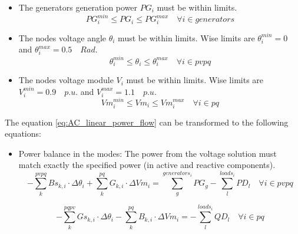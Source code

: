 \documentclass[nols,a4paper,twoside,notoc,fleqn]{tufte-book}
\begin{document}
\begin{itemize}
	\item The generators generation power $PG_i$ must be within limits.
	\begin{equation}
	PG_i^{min} \leq PG_i \leq PG_i^{max}  \quad \forall i \in generators
	\end{equation}
	
	\item The nodes voltage angle $\theta_i$ must be within limits. Wise limits are  $\theta_i^{min}=0$ and $\theta_i^{max}=0.5 \quad Rad$.
	\begin{equation}
	\theta_i^{min} \leq \theta_i \leq \theta_i^{max}  \quad \forall i \in pvpq
	\end{equation}
	
	\item The nodes voltage module $V_i$ must be within limits. Wise limits are  $V_i^{min}=0.9 \quad p.u.$ and $V_i^{max}=1.1 \quad p.u$.
	\begin{equation}
	Vm_i^{min} \leq Vm_i \leq Vm_i^{max}  \quad \forall i \in pq
	\end{equation}
\end{itemize}


The equation \ref{eq:AC_linear_power_flow} can be transformed to the following equations:


\begin{itemize}
	\item Power balance in the modes: The power from the voltage solution must match exactly the specified power (in active and reactive components).
	\begin{equation}
	-\sum_{k}^{pvpq}Bs_{k,i} \cdot \Delta\theta_i + \sum_{k}^{pq}G_{k,i} \cdot \Delta Vm_i = \sum_{g}^{generators_i} PG_{g} - \sum_{l}^{loads_i} PD_l \quad \forall i \in pvpq
	\end{equation}

	\begin{equation}
	-\sum_{k}^{pqpv}Gs_{k,i} \cdot \Delta\theta_i - \sum_{k}^{pq}B_{k,i} \cdot \Delta Vm_i = - \sum_{l}^{loads_i} QD_l \quad \forall i \in pq
	\end{equation}

\end{itemize}
\end{document}
